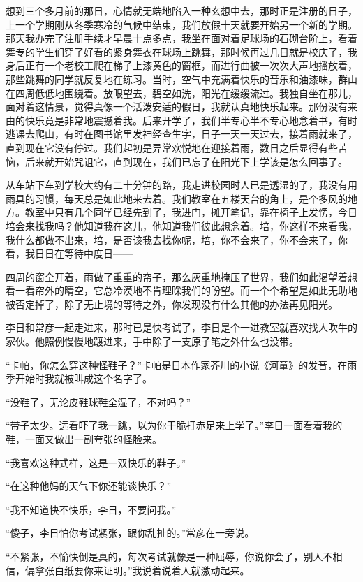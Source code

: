 \par 想到三个多月前的那日，心情就无端地陷入一种玄想中去，那时正是注册的日子，上一个学期刚从冬季寒冷的气候中结束，我们放假十天就要开始另一个新的学期。那天我办完了注册手续才早晨十点多点，我坐在面对着足球场的石砌台阶上，看着舞专的学生们穿了好看的紧身舞衣在球场上跳舞，那时候再过几日就是校庆了，我身后正有一个老校工爬在梯子上漆黄色的窗框，而进行曲被一次次大声地播放着，那些跳舞的同学就反复地在练习。当时，空气中充满着快乐的音乐和油漆味，群山在四周低低地围绕着。放眼望去，碧空如洗，阳光在缓缓流过。我独自坐在那儿，面对着这情景，觉得真像一个活泼安适的假日，我就认真地快乐起来。那份没有来由的快乐竟是非常地震撼着我。后来开学了，我们半专心半不专心地念着书，有时逃课去爬山，有时在图书馆里发神经查生字，日子一天一天过去，接着雨就来了，直到现在它没有停过。我们起初是异常欢悦地在迎接着雨，数日之后显得有些苦恼，后来就开始咒诅它，直到现在，我们已忘了在阳光下上学该是怎么回事了。
\par 从车站下车到学校大约有二十分钟的路，我走进校园时人已是透湿的了，我没有用雨具的习惯，每天总是如此地来去着。我们教室在五楼天台的角上，是个多风的地方。教室中只有几个同学已经先到了，我进门，摊开笔记，靠在椅子上发愣，今日培会来找我吗？他知道我在这儿，他知道我们彼此想念着。培，你这样不来看我，我什么都做不出来，培，是否该我去找你呢，培，你不会来了，你不会来了，你看，我日日在等待中度日——
\par 四周的窗全开着，雨做了重重的帘子，那么灰重地掩压了世界，我们如此渴望着想看一看帘外的晴空，它总冷漠地不肯理睬我们的盼望。而一个个希望是如此无助地被否定掉了，除了无止境的等待之外，你发现没有什么其他的办法再见阳光。
\par 李日和常彦一起走进来，那时已是快考试了，李日是个一进教室就喜欢找人吹牛的家伙。他照例慢慢地踱进来，手中除了一支原子笔之外什么也没带。
\par “卡帕，你怎么穿这种怪鞋子？”卡帕是日本作家芥川的小说《河童》的发音，在雨季开始时我就被叫成这个名字了。
\par “没鞋了，无论皮鞋球鞋全湿了，不对吗？”
\par “带子太少。远看吓了我一跳，以为你干脆打赤足来上学了。”李日一面看着我的鞋，一面又做出一副夸张的怪脸来。
\par “我喜欢这种式样，这是一双快乐的鞋子。”
\par “在这种他妈的天气下你还能谈快乐？”
\par “我不知道快不快乐，李日，不要问我。”
\par “傻子，李日怕你考试紧张，跟你乱扯的。”常彦在一旁说。
\par “不紧张，不愉快倒是真的，每次考试就像是一种屈辱，你说你会了，别人不相信，偏拿张白纸要你来证明。”我说着说着人就激动起来。
